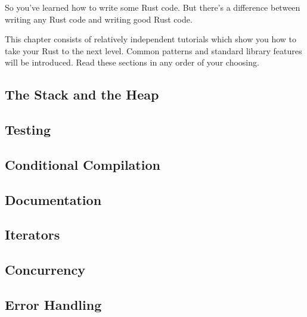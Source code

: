 So you've learned how to write some Rust code. But there's a difference between writing any Rust code and writing good Rust code.

\blank

This chapter consists of relatively independent tutorials which show you how to take your Rust to the next level. Common patterns 
and standard library features will be introduced. Read these sections in any order of your choosing.

\subsection{The Stack and the Heap}
\label{sec:effective_stackAndHeap}


\subsection{Testing}
\label{sec:effective_testing}


\subsection{Conditional Compilation}
\label{sec:effective_conditionalCompilation}


\subsection{Documentation}
\label{sec:effective_documentation}


\subsection{Iterators}
\label{sec:effective_iterators}


\subsection{Concurrency}
\label{sec:effective_concurrency}


\subsection{Error Handling}
\label{sec:effective_errorHandling}

